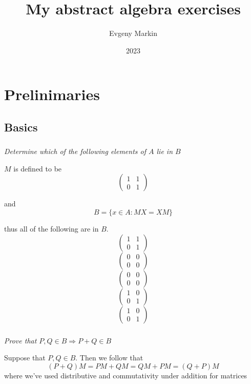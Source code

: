 \documentclass[11pt,oneside,titlepage]{book}
\title{My abstract algebra exercises}
\author{Evgeny Markin}
\date{2023}
\DeclareMathOperator \ra {\Rightarrow}
\begin{document}
\maketitle
\tableofcontents

\chapter*{Prelinimaries}

\section{Basics}

\subsection{}

\textit{Determine which of the following elements of $A$ lie in $B$}

$M$ is defined to be
$$
\begin{pmatrix}
  1 & 1\\
  0 & 1
\end{pmatrix}
$$

and
$$B = \{x \in A : MX = XM\}$$

thus all of the following are in $B$.
$$
\begin{pmatrix}
  1 & 1\\
  0 & 1
\end{pmatrix}
$$
$$
\begin{pmatrix}
  0 & 0\\
  0 & 0
\end{pmatrix}
$$
$$
\begin{pmatrix}
  0 & 0\\
  0 & 0
\end{pmatrix}
$$
$$
\begin{pmatrix}
  1 & 0\\
  0 & 1
\end{pmatrix}
$$
$$
\begin{pmatrix}
  1 & 0\\
  0 & 1
\end{pmatrix}
$$

\subsection{}

\textit{Prove that $P, Q \in B \ra P + Q \in B$}

Suppose that $P, Q \in B$. Then we follow that
$$(P + Q)M = PM + QM = QM + PM = (Q + P)M$$
where we've used distributive and commutativity under addition for matrices
\end{document}
